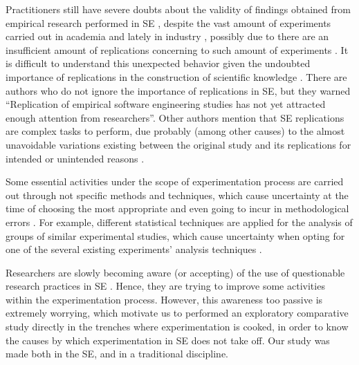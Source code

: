 Practitioners still have severe doubts about the validity of findings obtained from empirical research performed in SE \cite{Lo-2015-Practitioners-Perceive}, despite the vast amount of experiments carried out in academia \cite{Sjoberg2005-surveyexperimentsESE} and lately in industry \cite{dieste-2013-industry-experiments}, possibly due to there are an insufficient amount of replications \cite{da-silva-2012-replication-on-empirical-studies} concerning to such amount of experiments \cite{Sjoberg2005-surveyexperimentsESE,dieste-2013-industry-experiments}. It is difficult to understand this unexpected behavior given the undoubted importance of replications in the construction of scientific knowledge \cite{Demagalhaes-2015-SMS-Replications,Carver-2014-Replications-of-SE}. There are authors who do not ignore the importance of replications in SE, but they warned \textquotedblleft Replication of empirical software engineering studies has not yet attracted enough attention from researchers\textquotedblright \cite{Carver-2014-Replications-of-SE}. Other authors mention that SE replications are complex tasks to perform, due probably (among other causes) to the almost unavoidable variations existing between the original study and its replications for intended or unintended reasons \cite{Shull2002-TacitKnoeledge,Gomez-Juristo-2014-Understanding-replication}.

Some essential activities under the scope of experimentation process are carried out through not specific methods and techniques,  which cause uncertainty at the time of choosing the most appropriate and even going to incur in methodological errors \cite{Vegas-2016-Crossover-Designs-ESE,Reyes-2018-Statistical-Errors-in-SE,Jorgensen-2016-Incorrects-Results-SEE}. For example, different statistical techniques are applied for the analysis of groups of similar experimental studies, which cause uncertainty when opting for one of the several existing experiments' analysis techniques \cite{Reyes-2018-Statistical-Errors-in-SE}. 

Researchers are slowly becoming aware (or accepting) of the use of questionable research practices in SE \cite{Jorgensen-2016-Incorrects-Results-SEE}. Hence, they are trying to improve some activities within the experimentation process. However, this awareness too passive is extremely worrying, which motivate us to performed an exploratory comparative study directly in the trenches where experimentation is cooked, in order to know the causes by which experimentation in SE does not take off. Our study was made both in the SE, and in a traditional discipline.